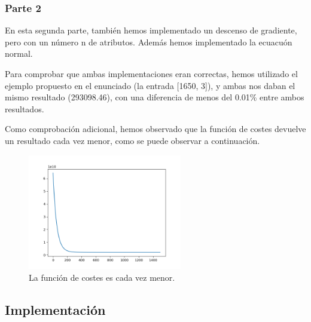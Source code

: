 \documentclass[11pt]{article}
\begin{document}
\subsubsection {Parte 2}

En esta segunda parte, también hemos implementado un descenso de gradiente, pero con un número n de atributos. Además hemos implementado la ecuacuón normal.

Para comprobar que ambas implementaciones eran correctas, hemos utilizado el ejemplo propuesto en el enunciado (la entrada [1650, 3]), y ambas nos daban el mismo resultado (293098.46), con una diferencia de menos del 0.01\% entre ambos resultados.

Como comprobación adicional, hemos observado que la función de costes devuelve un resultado cada vez menor, como se puede observar a continuación.

 \begin{figure}[h!]
    \begin{center}
    \includegraphics[width=0.6\textwidth]{Imagenes/gradiantDescenseResult2.png}
    \caption{La función de costes es cada vez menor.}
    \label{fig:Resultados}
    \end{center}
 \end{figure}

\newpage
\subsection{Implementación}


\end{document}

